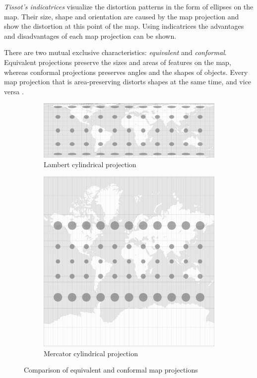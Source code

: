 \emph{Tissot's indicatrices} visualize the distortion patterns in the form of ellipses on the map. Their size, shape and orientation are caused by the map projection and show the distortion at this point of the map. Using indicatrices the advantages and disadvantages of each map projection can be shown.

There are two mutual exclusive characteristics: \emph{equivalent} and \emph{conformal}. Equivalent projections preserve the sizes and areas of features on the map, whereas conformal projections preserves angles and the shapes of objects. Every map projection that is area-preserving distorts shapes at the same time, and vice versa
\cite{mapProjectionGeokov}.

\begin{figure}[ht]
  \centering
  \begin{subfigure}{0.59\textwidth}
    \centering
    \includegraphics[width=0.9\linewidth]{graphics/basics/projection_distortion_lambert.png}
    \caption{Lambert cylindrical projection \protect\footnotemark}
  \end{subfigure}
  \begin{subfigure}{0.39\textwidth}
    \centering
    \includegraphics[width=0.9\linewidth]{graphics/basics/projection_distortion_mercator.png}
    \caption{Mercator cylindrical projection \protect\footnotemark}
  \end{subfigure}
  \caption{Comparison of equivalent and conformal map projections}
  \label{fig:lambert_vs_mercator}
\end{figure}

